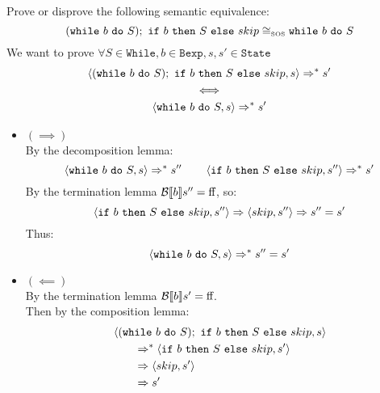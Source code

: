 \begin{exercise}{
    Prove or disprove the following semantic equivalence:
    \[ (\texttt{while}\ b\ \texttt{do}\ S);\ \texttt{if}\ b\ \texttt{then}\ S\ \texttt{else}\ skip \cong_{\text{\tiny SOS}} \texttt{while}\ b\ \texttt{do}\ S \]\vspace*{-0.6cm}
}
    We want to prove $\forall S \in \texttt{While}, b \in \texttt{Bexp}, s, s' \in \texttt{State}$
    \begin{gather*}
        \left<(\texttt{while}\ b\ \texttt{do}\ S);\ \texttt{if}\ b\ \texttt{then}\ S\ \texttt{else}\ skip, s\right> \Rightarrow^* s' \\
        \iff \\
        \left<\texttt{while}\ b\ \texttt{do}\ S, s\right> \Rightarrow^* s'
    \end{gather*}
    \begin{itemize}
        \item $(\implies)$ \vspace{0.2cm} \\
            By the decomposition lemma:\vspace*{-0.3cm}
            \[ \left<\texttt{while}\ b\ \texttt{do}\ S, s\right> \Rightarrow^* s'' \qquad \left<\texttt{if}\ b\ \texttt{then}\ S\ \texttt{else}\ skip, s''\right> \Rightarrow^* s' \]
            By the termination lemma $\mathcal{B} \llbracket b \rrbracket s'' = \text{ff}$, so:\vspace*{-0.3cm}
            \[ \left<\texttt{if}\ b\ \texttt{then}\ S\ \texttt{else}\ skip, s''\right> \Rightarrow \left<skip, s''\right> \Rightarrow s'' = s' \]
            Thus:
            \[ \left<\texttt{while}\ b\ \texttt{do}\ S, s\right> \Rightarrow^* s'' = s' \]
        \item $(\impliedby)$ \vspace{0.2cm} \\
            By the termination lemma $\mathcal{B} \llbracket b \rrbracket s' = \text{ff}$. \\
            Then by the composition lemma:\vspace*{-0.3cm}
            \begin{align*}
                &\left<(\texttt{while}\ b\ \texttt{do}\ S);\ \texttt{if}\ b\ \texttt{then}\ S\ \texttt{else}\ skip, s\right>
                \\&\qquad \Rightarrow^* \left<\texttt{if}\ b\ \texttt{then}\ S\ \texttt{else}\ skip, s'\right>
                \\&\qquad \Rightarrow \left<skip, s'\right>
                \\&\qquad \Rightarrow s'
            \end{align*}
    \end{itemize}
\end{exercise}
